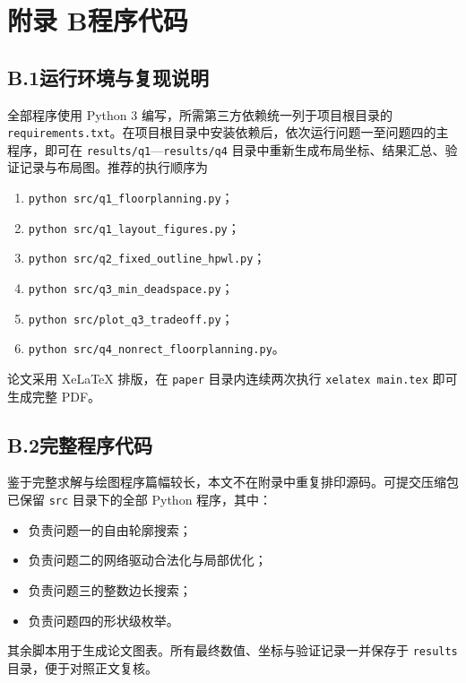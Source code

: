 \section*{附录 B\quad 程序代码}

\subsection*{B.1\quad 运行环境与复现说明}

全部程序使用 Python 3 编写，所需第三方依赖统一列于项目根目录的 \texttt{requirements.txt}。在项目根目录中安装依赖后，依次运行问题一至问题四的主程序，即可在 \texttt{results/q1}—\texttt{results/q4} 目录中重新生成布局坐标、结果汇总、验证记录与布局图。推荐的执行顺序为
\begin{enumerate}[label=\arabic*.,leftmargin=2.4em,itemsep=0.2em]
  \item \texttt{python src/q1\_floorplanning.py}；
  \item \texttt{python src/q1\_layout\_figures.py}；
  \item \texttt{python src/q2\_fixed\_outline\_hpwl.py}；
  \item \texttt{python src/q3\_min\_deadspace.py}；
  \item \texttt{python src/plot\_q3\_tradeoff.py}；
  \item \texttt{python src/q4\_nonrect\_floorplanning.py}。
\end{enumerate}
论文采用 XeLaTeX 排版，在 \texttt{paper} 目录内连续两次执行 \texttt{xelatex main.tex} 即可生成完整 PDF。

\subsection*{B.2\quad 完整程序代码}

鉴于完整求解与绘图程序篇幅较长，本文不在附录中重复排印源码。可提交压缩包已保留 \texttt{src} 目录下的全部 Python 程序，其中：
\begin{itemize}[leftmargin=2.4em,itemsep=0.2em]
  \item {} 负责问题一的自由轮廓搜索；
  \item {} 负责问题二的网络驱动合法化与局部优化；
  \item {} 负责问题三的整数边长搜索；
  \item {} 负责问题四的形状级枚举。
\end{itemize}
其余脚本用于生成论文图表。所有最终数值、坐标与验证记录一并保存于 \texttt{results} 目录，便于对照正文复核。

